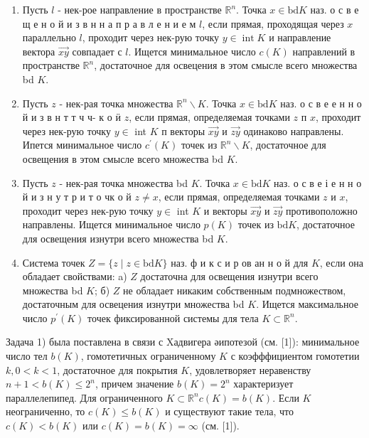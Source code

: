 \documentclass[10pt]{article}
\begin{document}
\begin{enumerate}

  \item Пусть $l$ - нек-рое направление в пространстве $\mathbb{R}^{n}$. Точка $x \in \mathrm{bd} K$ наз. о с в е щ е н о й и з в н н а п р а в л е н и е м $l$, если прямая, проходящая через $x$ параллельно $l$, проходит через нек-рую точку $y \in \operatorname{int} K$ и направление вектора $\overrightarrow{x y}$ совпадает с $l$. Ищется минимальное число $c(K)$ направлений в пространстве $\mathbb{R}^{n}$, достаточное для освецения в этом смысле всего множества bd $K$.



  \item Пусть $z$ - нек-рая точка множества $\mathbb{R}^{n} \backslash K$. Точка $x \in \mathrm{bd} K$ наз. о с в е е н н о й и з в н т т ч ч- к о ӥ $z$, если прямая, определяемая точками $z$ п $x$, проходит через нек-рую точку $y \in$ int $K$ п векторы $\overrightarrow{x y}$ и $\overrightarrow{z y}$ одинаково направлены. Ипется минимальное число $c^{\prime}(K)$ точек из $\mathbb{R}^{n} \backslash K$, достаточное для освещения в этом смысле всего множества bd $K$.



  \item Пусть $z$ - нек-рая точка множества bd $K$. Точка $x \in \mathrm{bd} K$ наз. о с в е і е н н о й и з н у т р и т о чк о й $z \neq x$, если прямая, определяемая точками $z$ и $x$, проходит через нек-рую точку $y \in$ int $K$ и векторы $\overrightarrow{x y}$ и $\overrightarrow{z y}$ противоположно направлены. Ищется минимальное число $p(K)$ точек из $\mathrm{bd} K$, достаточное для освещения изнутри всего множества bd $K$.



  \item Система точек $Z=\{z \mid z \in \mathrm{bd} K\}$ наз. ф и к с и р ов ан н о й для $K$, если она обладает свойствами: a) $Z$ достаточна для освещения изнутри всего множества bd $K$; б) $Z$ не обладает никаким собственным подмножеством, достаточным для освецения изнутри множества bd $K$. Ищется максимальное число $p^{\prime}(K)$ точек фиксированной системы для тела $K \subset \mathbb{R}^{n}$.



\end{enumerate}



Задача 1) была поставлена в связи с Xадвигера әипотезой (см. [1]): минимальное число тел $b(K)$, гомотетичных ограниченному $K$ с коэфффициентом гомотетии $k, 0<k<1$, достаточное для покрытия $K$, удовлетворяет неравенству $n+1<b(K) \leqslant 2^{n}$, причем значение $b(K)=2^{n}$ характеризует параллелепипед. Для ограниченного $K \subset \mathbb{R}^{n} c(K)=b(K)$. Если $K$ неограниченно, то $c(K) \leqslant b(K)$ и существуют такие тела, что $c(K)<b(K)$ или $c(K)=b(K)=\infty$ (см. [1]).
\end{document}
